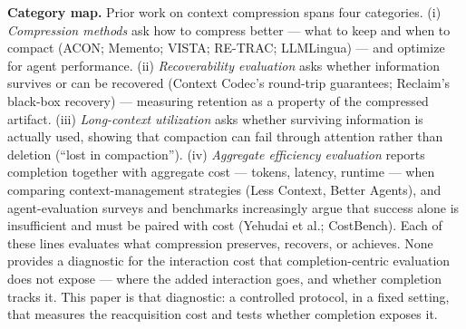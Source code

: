 \documentclass[11pt]{article}
\begin{document}
\textbf{Category map.} Prior work on context compression spans four categories. (i)
\emph{Compression methods} ask how to compress better --- what to keep and when to compact
(ACON; Memento; VISTA; RE-TRAC; LLMLingua) --- and optimize for agent
performance. (ii) \emph{Recoverability evaluation} asks whether information survives or can
be recovered (Context Codec's round-trip guarantees; Reclaim's black-box recovery) --- measuring retention as a property of the compressed artifact. (iii)
\emph{Long-context utilization} asks whether surviving information is actually used, showing
that compaction can fail through attention rather than deletion (``lost in compaction'').
(iv) \emph{Aggregate efficiency evaluation} reports completion together with aggregate cost ---
tokens, latency, runtime --- when comparing context-management strategies (Less Context,
Better Agents), and agent-evaluation surveys and benchmarks increasingly argue that
success alone is insufficient and must be paired with cost (Yehudai et al.; CostBench).
Each of these lines evaluates what compression preserves, recovers, or achieves. None
provides a diagnostic for the interaction cost that completion-centric evaluation does
not expose --- where the added interaction goes, and whether completion tracks it. This
paper is that diagnostic: a controlled protocol, in a fixed setting, that measures the
reacquisition cost and tests whether completion exposes it.
\end{document}
